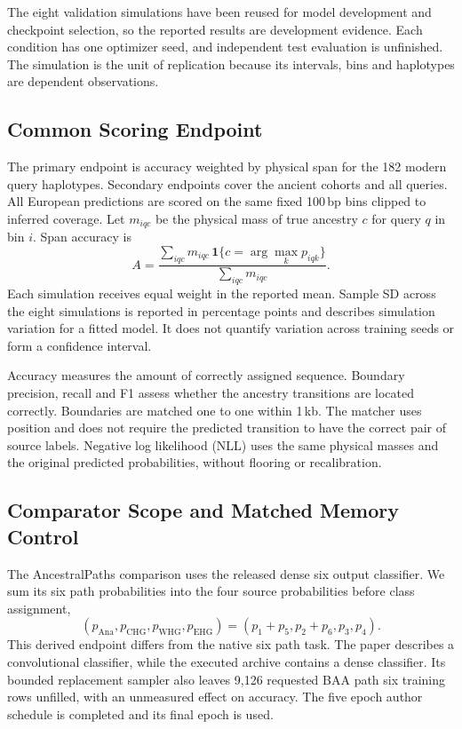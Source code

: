 \documentclass[letterpaper]{article}
\begin{document}
The eight validation simulations have been reused for model development and checkpoint selection, so the reported results are development evidence. Each condition has one optimizer seed, and independent test evaluation is unfinished. The simulation is the unit of replication because its intervals, bins and haplotypes are dependent observations.

\subsection{Common Scoring Endpoint}
The primary endpoint is accuracy weighted by physical span for the 182 modern query haplotypes. Secondary endpoints cover the ancient cohorts and all queries. All European predictions are scored on the same fixed 100\,bp bins clipped to inferred coverage. Let $m_{iqc}$ be the physical mass of true ancestry $c$ for query $q$ in bin $i$. Span accuracy is
\begin{equation}
A=
\frac{\sum_{iqc}m_{iqc}\,
\mathbf{1}\{c=\arg\max_k p_{iqk}\}}
{\sum_{iqc}m_{iqc}}.
\end{equation}
Each simulation receives equal weight in the reported mean. Sample SD across the eight simulations is reported in percentage points and describes simulation variation for a fitted model. It does not quantify variation across training seeds or form a confidence interval.

Accuracy measures the amount of correctly assigned sequence. Boundary precision, recall and F1 assess whether the ancestry transitions are located correctly. Boundaries are matched one to one within 1\,kb. The matcher uses position and does not require the predicted transition to have the correct pair of source labels. Negative log likelihood (NLL) uses the same physical masses and the original predicted probabilities, without flooring or recalibration.

\subsection{Comparator Scope and Matched Memory Control}
The AncestralPaths comparison uses the released dense six output classifier. We sum its six path probabilities into the four source probabilities before class assignment,
\begin{equation}
(p_{\mathrm{Ana}},p_{\mathrm{CHG}},p_{\mathrm{WHG}},p_{\mathrm{EHG}})
=(p_1+p_5,p_2+p_6,p_3,p_4).
\end{equation}
This derived endpoint differs from the native six path task. The paper describes a convolutional classifier, while the executed archive contains a dense classifier. Its bounded replacement sampler also leaves 9,126 requested BAA path six training rows unfilled, with an unmeasured effect on accuracy. The five epoch author schedule is completed and its final epoch is used.
\end{document}
